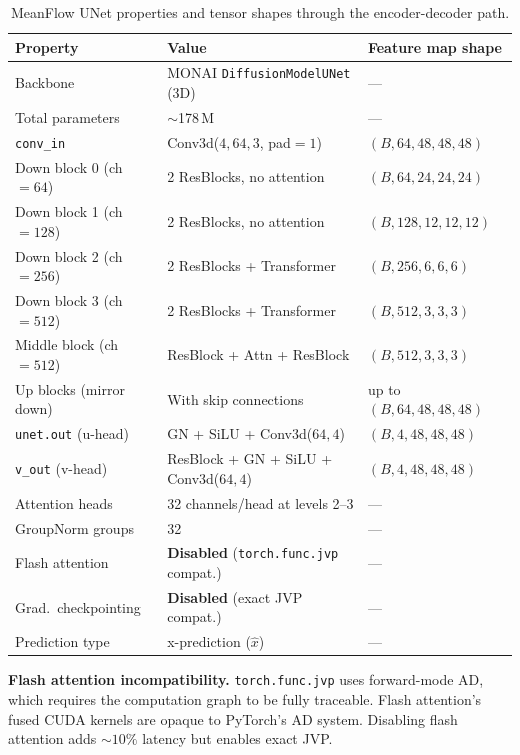 \documentclass[11pt,a4paper]{article}
\newcommand{\code}[1]{\texttt{#1}}
\begin{document}
\begin{table}[ht]
\centering
\caption{MeanFlow UNet properties and tensor shapes through the encoder-decoder path.}
\label{tab:unet}
\begin{tabular}{lll}
\toprule
\textbf{Property}          & \textbf{Value} & \textbf{Feature map shape} \\
\midrule
Backbone                   & MONAI \code{DiffusionModelUNet} (3D) & --- \\
Total parameters           & ${\sim}$178\,M & --- \\
\code{conv\_in}            & Conv3d($4, 64, 3$, pad$=1$) & $(B, 64, 48, 48, 48)$ \\
Down block 0 (ch$=64$)     & 2 ResBlocks, no attention & $(B, 64, 24, 24, 24)$ \\
Down block 1 (ch$=128$)    & 2 ResBlocks, no attention & $(B, 128, 12, 12, 12)$ \\
Down block 2 (ch$=256$)    & 2 ResBlocks + Transformer & $(B, 256, 6, 6, 6)$ \\
Down block 3 (ch$=512$)    & 2 ResBlocks + Transformer & $(B, 512, 3, 3, 3)$ \\
Middle block (ch$=512$)    & ResBlock + Attn + ResBlock & $(B, 512, 3, 3, 3)$ \\
Up blocks (mirror down)    & With skip connections & up to $(B, 64, 48, 48, 48)$ \\
\code{unet.out} (u-head)   & GN + SiLU + Conv3d($64, 4$) & $(B, 4, 48, 48, 48)$ \\
\code{v\_out} (v-head)     & ResBlock + GN + SiLU + Conv3d($64, 4$) & $(B, 4, 48, 48, 48)$ \\
\midrule
Attention heads            & 32 channels/head at levels 2--3 & --- \\
GroupNorm groups           & 32 & --- \\
Flash attention            & \textbf{Disabled} (\code{torch.func.jvp} compat.) & --- \\
Grad.\ checkpointing      & \textbf{Disabled} (exact JVP compat.) & --- \\
Prediction type            & x-prediction ($\hat{x}$) & --- \\
\bottomrule
\end{tabular}
\end{table}

\textbf{Flash attention incompatibility.}  \code{torch.func.jvp} uses
forward-mode AD, which requires the computation graph to be fully traceable.
Flash attention's fused CUDA kernels are opaque to PyTorch's AD system.
Disabling flash attention adds ${\sim}10\%$ latency but enables exact JVP.
\end{document}
